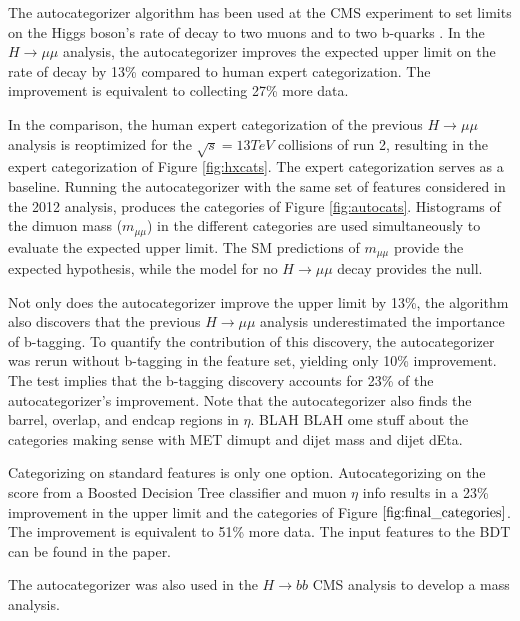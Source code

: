 \documentclass[review]{elsarticle}
\begin{document}
The autocategorizer algorithm has been used at the CMS experiment to set limits on the Higgs boson's rate of decay to two muons \cite{cmshiggsmumu2017} and to two b-quarks \cite{VHbbCitation}. In the $H\rightarrow\mu\mu$ analysis, the autocategorizer improves the expected upper limit on the rate of decay by 13\% compared to human expert categorization. The improvement is equivalent to collecting 27\% more data. 

In the comparison, the human expert categorization of the previous $H\rightarrow\mu\mu$ analysis \cite{cmshiggsmumu2012} is reoptimized for the $\sqrt{s} = 13 TeV$ collisions of run 2, resulting in the expert categorization of Figure \ref{fig:hxcats}. The expert categorization serves as a baseline. Running the autocategorizer with the same set of features considered in the 2012 analysis, produces the categories of Figure \ref{fig:autocats}. Histograms of the dimuon mass ($m_{\mu\mu}$) in the different categories are used simultaneously to evaluate the expected upper limit. The SM predictions of $m_{\mu\mu}$ provide the expected hypothesis, while the model for no $H\rightarrow\mu\mu$ decay provides the null.

Not only does the autocategorizer improve the upper limit by 13\%, the algorithm also discovers that the previous $H\rightarrow\mu\mu$ analysis underestimated the importance of b-tagging. To quantify the contribution of this discovery, the autocategorizer was rerun without b-tagging in the feature set, yielding only 10\% improvement. The test implies that the b-tagging discovery accounts for 23\% of the autocategorizer's improvement. Note that the autocategorizer also finds the barrel, overlap, and endcap regions in $\eta$. BLAH BLAH ome stuff about the categories making sense with MET dimupt and dijet mass and dijet dEta.

Categorizing on standard features is only one option. Autocategorizing on the score from a Boosted Decision Tree classifier and muon $\eta$ info results in a 23\% improvement in the upper limit and the categories of Figure $\ref{fig:final_categories}$. The improvement is equivalent to 51\% more data. The input features to the BDT can be found in the paper.

The autocategorizer was also used in the $H\rightarrow bb$ CMS analysis to develop a mass analysis.


\end{document}
